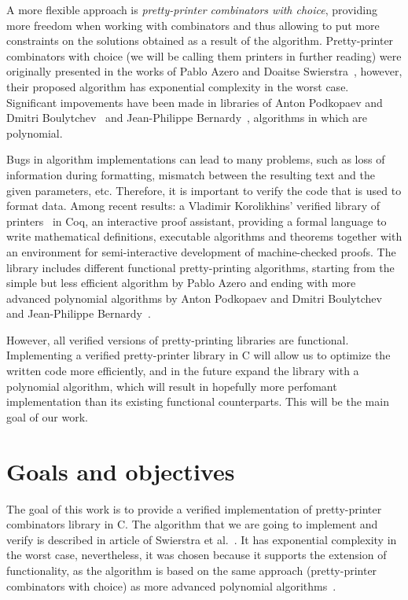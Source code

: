 \documentclass[14pt]{constructor-diploma}
\begin{document}
A more flexible approach is \textit{pretty-printer combinators with choice},
providing more freedom when working with combinators and thus allowing to put more constraints on the solutions obtained
as a result of the algorithm.
Pretty-printer combinators with choice (we will be calling them printers in further reading) were originally presented in the works of Pablo Azero and Doaitse Swierstra~\cite{azero, swierstra}, 
however, their proposed algorithm has exponential complexity in the worst case. Significant impovements have been made in 
libraries of Anton Podkopaev and Dmitri Boulytchev~\cite{podkopaev} and Jean-Philippe Bernardy~\cite{bernardy}, algorithms in which are polynomial.

Bugs in algorithm implementations can lead to many problems, such as loss of information during formatting,
mismatch between the resulting text and the given parameters, etc. Therefore, it is important to verify 
the code that is used to format data.
Among recent results: a Vladimir Korolikhins' verified library of printers~\cite{korolihin} in Coq, an interactive proof assistant, 
providing a formal language to write mathematical definitions, executable algorithms and theorems together with an environment for semi-interactive development of machine-checked proofs. 
The library includes different functional pretty-printing algorithms,
starting from the simple but less efficient algorithm by Pablo Azero and ending 
with more advanced polynomial algorithms by Anton Podkopaev and Dmitri Boulytchev~\cite{podkopaev} and Jean-Philippe Bernardy~\cite{bernardy}.

However, all verified versions of pretty-printing libraries are functional. 
Implementing a verified pretty-printer library in C will allow us to optimize the written code more efficiently, and in the future 
expand the library with a polynomial algorithm, which will result in hopefully more perfomant implementation than its existing functional counterparts.
This will be the main goal of our work.

\section{Goals and objectives}
The goal of this work is to provide a verified implementation of pretty-printer combinators library in C. 
The algorithm that we are going to implement and verify 
is described in article of Swierstra et al.~\cite{swierstra}. 
It has exponential complexity in the worst case, nevertheless, 
it was chosen because it supports the extension of functionality, 
as the algorithm is based on the same approach (pretty-printer combinators with choice) 
as more advanced polynomial algorithms~\cite{podkopaev,bernardy}. 
\end{document}
